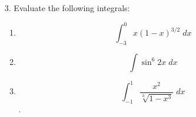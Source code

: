 \documentclass[11pt,reqno]{article}
\theoremstyle{definition}
\begin{document}
\begin{itemize}
		\item[3.] Evaluate the following integrals: 
		\begin{enumerate}
			\item $$\int_{-3}^{0} x(1 - x)^{3/2} \; dx$$
			\item $$\int \sin^6 2x \; dx$$ 
			\item $$\int_{-1}^{1} \frac{x^2}{\sqrt[3]{1 - x^3}} \; dx$$. 
		\end{enumerate}
		
	\end{itemize}

	
	
\end{document}
